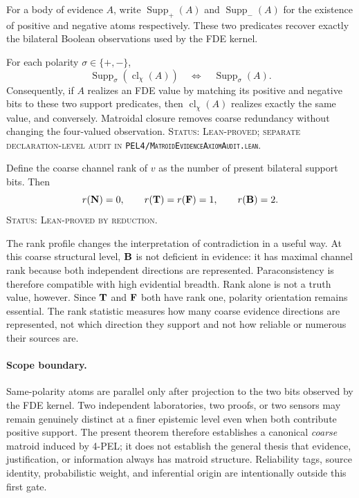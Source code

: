 For a body of evidence \(A\), write
\(\operatorname{Supp}_{+}(A)\) and \(\operatorname{Supp}_{-}(A)\) for the
existence of positive and negative atoms respectively. These two predicates
recover exactly the bilateral Boolean observations used by the FDE kernel.

\begin{proposition}
For each polarity \(\sigma\in\{+,-\}\),
\[
  \operatorname{Supp}_{\sigma}(\operatorname{cl}_{\chi}(A))
  \quad\Longleftrightarrow\quad
  \operatorname{Supp}_{\sigma}(A).
\]
Consequently, if \(A\) realizes an FDE value by matching its positive and
negative bits to these two support predicates, then
\(\operatorname{cl}_{\chi}(A)\) realizes exactly the same value, and conversely.
Matroidal closure removes coarse redundancy without changing the four-valued
observation.
\textup{\textsc{Status: Lean-proved; separate declaration-level audit in
\texttt{PEL4/MatroidEvidenceAxiomAudit.lean}.}}
\end{proposition}

\begin{proposition}
Define the coarse channel rank of \(v\) as the number of present bilateral
support bits. Then
\[
  r(\mathbf{N})=0,\qquad
  r(\mathbf{T})=r(\mathbf{F})=1,\qquad
  r(\mathbf{B})=2.
\]
\textup{\textsc{Status: Lean-proved by reduction.}}
\end{proposition}

The rank profile changes the interpretation of contradiction in a useful way.
At this coarse structural level, \(\mathbf{B}\) is not deficient in evidence: it has
maximal channel rank because both independent directions are represented.
Paraconsistency is therefore compatible with high evidential breadth. Rank
alone is not a truth value, however. Since \(\mathbf{T}\) and \(\mathbf{F}\) both have
rank one, polarity orientation remains essential. The rank statistic measures
how many coarse evidence directions are represented, not which direction they
support and not how reliable or numerous their sources are.

\paragraph{Scope boundary.}
Same-polarity atoms are parallel only after projection to the two bits observed
by the FDE kernel. Two independent laboratories, two proofs, or two sensors may
remain genuinely distinct at a finer epistemic level even when both contribute
positive support. The present theorem therefore establishes a canonical
\emph{coarse} matroid induced by 4-PEL; it does not establish the general thesis
that evidence, justification, or information always has matroid structure.
Reliability tags, source identity, probabilistic weight, and inferential origin
are intentionally outside this first gate.

